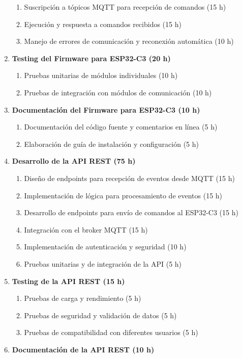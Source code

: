 \documentclass[
11pt, %
]{charter}
\begin{document}
\begin{enumerate}
\begin{enumerate}
\item Suscripción a tópicos MQTT para recepción de comandos (15 h)
\item Ejecución y respuesta a comandos recibidos (15 h)
\item Manejo de errores de comunicación y reconexión automática (10 h)
\end{enumerate}
\item \textbf{Testing del Firmware para ESP32-C3 (20 h)}
\begin{enumerate}
\item Pruebas unitarias de módulos individuales (10 h)
\item Pruebas de integración con módulos de comunicación (10 h)
\end{enumerate}
\item \textbf{Documentación del Firmware para ESP32-C3 (10 h)}
\begin{enumerate}
\item Documentación del código fuente y comentarios en línea (5 h)
\item Elaboración de guía de instalación y configuración (5 h)
\end{enumerate}
\item \textbf{Desarrollo de la API REST (75 h)}
\begin{enumerate}
\item Diseño de endpoints para recepción de eventos desde MQTT (15 h)
\item Implementación de lógica para procesamiento de eventos (15 h)
\item Desarrollo de endpoints para envío de comandos al ESP32-C3 (15 h)
\item Integración con el broker MQTT (15 h)
\item Implementación de autenticación y seguridad (10 h)
\item Pruebas unitarias y de integración de la API (5 h)
\end{enumerate}
\item \textbf{Testing de la API REST (15 h)}
\begin{enumerate}
\item Pruebas de carga y rendimiento (5 h)
\item Pruebas de seguridad y validación de datos (5 h)
\item Pruebas de compatibilidad con diferentes usuarios (5 h)
\end{enumerate}
\item \textbf{Documentación de la API REST (10 h)}
\begin{enumerate}

\end{enumerate}
\end{enumerate}
\end{document}
